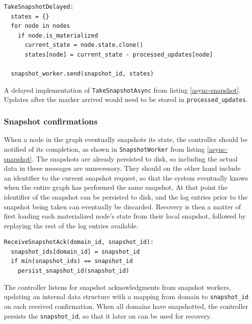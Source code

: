 \documentclass[b5paper]{report}
\begin{document}
\begin{listing}[H]
  \begin{verbatim}
TakeSnapshotDelayed:
  states = {}
  for node in nodes
    if node.is_materialized
      current_state = node.state.clone()
      states[node] = current_state - processed_updates[node]

  snapshot_worker.send(snapshot_id, states)
  \end{verbatim}
  \caption{
    A delayed implementation of \texttt{TakeSnapshotAsync} from listing
    \ref{async-snapshot}. Updates after the marker arrived would need to be stored
    in \texttt{processed\_updates}.
  }
\end{listing}

\subsubsection{Snapshot confirmations}
When a node in the graph eventually snapshots its state, the controller should
be notified of its completion, as shown in \texttt{SnapshotWorker} from listing
\ref{async-snapshot}. The snapshots are already persisted to disk, so including
the actual data in these messages are unnecessary. They should on the other
hand include an identifier to the current snapshot request, so that the system
eventually knows when the entire graph has performed the same snapshot. At that
point the identifier of the snapshot can be persisted to disk, and the log
entries prior to the snapshot being taken can eventually be discarded.
Recovery is then a matter of first loading each materialized node's state from
their local snapshot, followed by replaying the rest of the log entries available.

\begin{listing}[H]
  \begin{verbatim}
ReceiveSnapshotAck(domain_id, snapshot_id):
  snapshot_ids[domain_id] = snapshot_id
  if min(snapshot_ids) == snapshot_id
    persist_snapshot_id(snapshot_id)
  \end{verbatim}
  \caption{
    The controller listens for snapshot acknowledgments from snapshot
    workers, updating an internal data structure with a mapping from domain to
    \texttt{snapshot\_id} on each received confirmation. When all domains have
    snapshotted, the controller persists the \texttt{snapshot\_id}, so that it
    later on can be used for recovery.
    \label{snapshot_acks}
  }
\end{listing}
\end{document}
